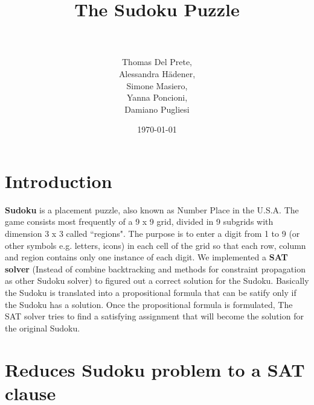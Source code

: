 \documentclass[paper=a4, fontsize=14pt]{scrartcl} %
\title{	
\huge The Sudoku Puzzle \\ %
\horrule{0.5pt} \\[0.5cm] %
}
\author{Thomas Del Prete, \\
		Alessandra H{\" a}dener, \\
		Simone Masiero, \\
		Yanna Poncioni, \\
		Damiano Pugliesi} %
\date{\normalsize\today} %
\begin{document}
	
	\maketitle
	
	\section*{Introduction}
	
		\textbf{Sudoku} is a placement puzzle, also known as Number Place in the U.S.A.
		\newline
		The game consists most frequently of a 9 x 9 grid, divided in 9 subgrids with dimension 3 x 3 called ``regions".
		\newline
		The purpose is to enter a digit from 1 to 9 (or other symbols e.g. letters, icons) in each cell of the grid so that each row, column and region contains only one instance of each digit.
		\newline
		We implemented a \textbf{SAT solver} (Instead of combine backtracking and methods for constraint propagation as other Sudoku solver) to figured out a correct solution for the Sudoku.
		\newline
		Basically the Sudoku is translated into a propositional formula that can be satify only if the Sudoku has a solution.
		\newline
		Once the propositional formula is formulated, The SAT solver tries to find a satisfying assignment that will become the solution for the original Sudoku.
			 			
	\section*{Reduces Sudoku problem to a SAT clause}
	
\end{document}
